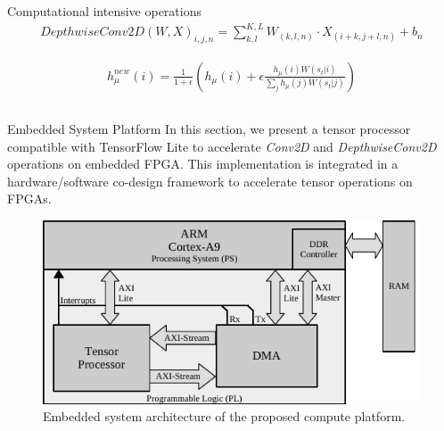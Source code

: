 \documentclass[final]{beamer}
\newlength{\onecolwid}
\newlength{\twocolwid}
\begin{document}
\begin{frame}[t]
\begin{columns}[t]
\begin{column}{\twocolwid}
\begin{alertblock}{Computational intensive operations}
\begin{eqnarray} \label{eq:dconv2D}
DepthwiseConv2D\left(W,X\right)_{i,j,n}=\sum_{k,l}^{K,L}W_{(k,l,n)} \cdot X_{(i+k,j+l,n)}+b_{n}
\end{eqnarray}

\begin{eqnarray} \label{eq:sbs_update}
h_\mu^{new}(i) = \frac{1}{1+\epsilon} \left(h_\mu(i) + \epsilon \frac{h_\mu(i) W(s_t|i) }{\sum_j h_\mu(j) W(s_t|j)} \right) 
\end{eqnarray}

\end{alertblock} 


\begin{columns}[t,totalwidth=\twocolwid] %

\begin{column}{\onecolwid} %


\begin{block}{Embedded System Platform}
In this section, we present a tensor processor compatible with TensorFlow Lite to accelerate \emph{Conv2D} and \emph{DepthwiseConv2D} operations on embedded FPGA. This implementation is integrated in a hardware/software co-design framework to accelerate tensor operations on FPGAs.

\begin{figure}
	\includegraphics[width=\linewidth]{../figures/system_design.pdf}
	\caption{Embedded system architecture of the proposed compute platform.}
	\label{fig:conv_sys_design}
\end{figure}
\end{block}


\end{column}
\end{columns}
\end{column}
\end{columns}
\end{frame}
\end{document}
